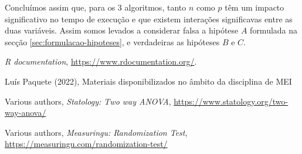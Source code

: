 \documentclass{uofa-eng-assignment}
\begin{document}
Concluímos assim que, para os 3 algoritmos, tanto $n$ como $p$ têm um impacto significativo no tempo de execução e que existem interações significavas entre as duas variáveis. Assim somos levados a considerar falsa a hipótese $A$ formulada na secção \ref{sec:formulacao-hipoteses}, e verdadeiras as hipóteses $B$ e $C$.

\begin{thebibliography}{ht}
\emph{R documentation}, \url{https://www.rdocumentation.org/}.

Luís Paquete (2022), Materiais disponibilizados no âmbito da disciplina de MEI

Various authors, \emph{Statology: Two way ANOVA}, \url{https://www.statology.org/two-way-anova/}

Various authors, \emph{Measuringu: Randomization Test}, \url{https://measuringu.com/randomization-test/}

\end{thebibliography}
\end{document}
